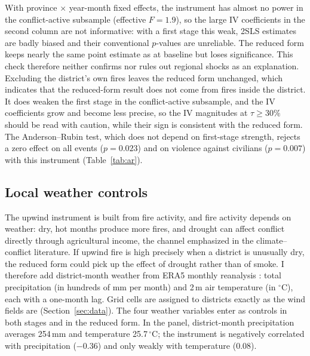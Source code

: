 \documentclass[12pt]{article}
\begin{document}
With province $\times$ year-month fixed effects, the instrument has almost no power in the conflict-active subsample (effective $F = 1.9$), so the large IV coefficients in the second column are not informative: with a first stage this weak, 2SLS estimates are badly biased and their conventional $p$-values are unreliable. The reduced form keeps nearly the same point estimate as at baseline but loses significance. This check therefore neither confirms nor rules out regional shocks as an explanation. Excluding the district's own fires leaves the reduced form unchanged, which indicates that the reduced-form result does not come from fires inside the district. It does weaken the first stage in the conflict-active subsample, and the IV coefficients grow and become less precise, so the IV magnitudes at $\tau \geq 30\%$ should be read with caution, while their sign is consistent with the reduced form. The Anderson--Rubin test, which does not depend on first-stage strength, rejects a zero effect on all events ($p=0.023$) and on violence against civilians ($p=0.007$) with this instrument (Table~\ref{tab:ar}).

\subsection{Local weather controls}
\label{sec:weather}

The upwind instrument is built from fire activity, and fire activity depends on weather: dry, hot months produce more fires, and drought can affect conflict directly through agricultural income, the channel emphasized in the climate--conflict literature. If upwind fire is high precisely when a district is unusually dry, the reduced form could pick up the effect of drought rather than of smoke. I therefore add district-month weather from ERA5 monthly reanalysis \citep{hersbach2023era5}: total precipitation (in hundreds of mm per month) and 2\,m air temperature (in $^{\circ}$C), each with a one-month lag. Grid cells are assigned to districts exactly as the wind fields are (Section~\ref{sec:data}). The four weather variables enter as controls in both stages and in the reduced form. In the panel, district-month precipitation averages 254\,mm and temperature 25.7\,$^{\circ}$C; the instrument is negatively correlated with precipitation ($-0.36$) and only weakly with temperature ($0.08$).
\end{document}
